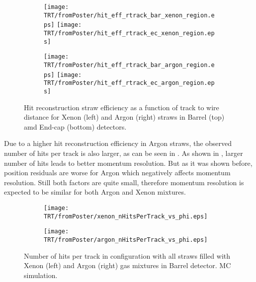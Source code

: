 \begin{figure}

\begin{subfigure}{.5\textwidth}
  \centering
  \texttt{[image: TRT/fromPoster/hit\_eff\_rtrack\_bar\_xenon\_region.eps]}
  \texttt{[image: TRT/fromPoster/hit\_eff\_rtrack\_ec\_xenon\_region.eps]}
\end{subfigure}%
\begin{subfigure}{.5\textwidth}
  \centering
  \texttt{[image: TRT/fromPoster/hit\_eff\_rtrack\_bar\_argon\_region.eps]}
  \texttt{[image: TRT/fromPoster/hit\_eff\_rtrack\_ec\_argon\_region.eps]}
\end{subfigure}

\caption{Hit reconstruction straw efficiency as a function of track to wire distance 
for Xenon (left) and Argon (right) straws in Barrel (top) amd End-cap (bottom) detectors.}
  \label{fig:hit_eff_rtrack_bar}
\end{figure}


Due to a higher hit reconstruction efficiency in Argon straws, the observed number of hits per track is also larger, as can be seen in . 
As shown in , larger number of hits leads to better momentum resolution. But as it was shown before, position residuals are
worse for Argon which negatively affects momentum resolution. Still both factors are quite small, therefore momentum resolution is expected to be similar for
both Argon and Xenon mixtures.

\begin{figure}

\begin{subfigure}{.5\textwidth}
  \centering
  \texttt{[image: TRT/fromPoster/xenon\_nHitsPerTrack\_vs\_phi.eps]}
\end{subfigure}%
\begin{subfigure}{.5\textwidth}
  \centering
  \texttt{[image: TRT/fromPoster/argon\_nHitsPerTrack\_vs\_phi.eps]}
\end{subfigure}

\caption{Number of hits per track in configuration with all straws filled with Xenon (left) and Argon (right) gas mixtures in Barrel detector. MC simulation.}
  \label{fig:nHitsPerTrack}
\end{figure}

